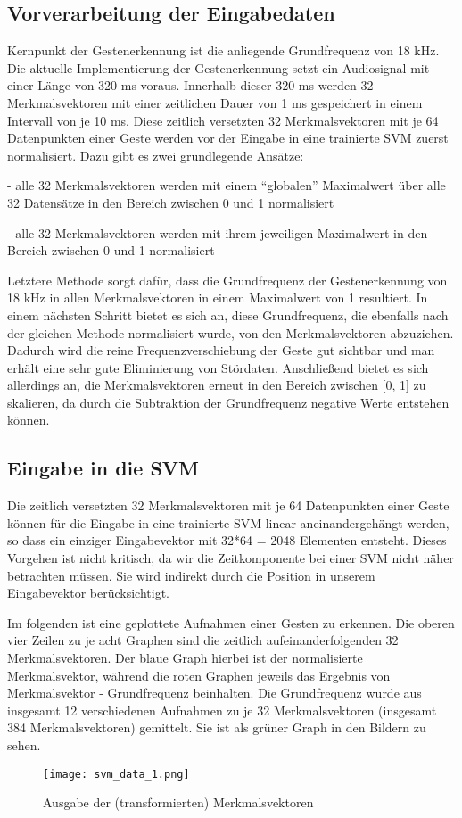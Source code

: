\subsection{Vorverarbeitung der Eingabedaten}

Kernpunkt der Gestenerkennung ist die anliegende Grundfrequenz von 18 kHz. 
Die aktuelle Implementierung der Gestenerkennung setzt ein Audiosignal mit einer Länge von 320 ms voraus. 
Innerhalb dieser 320 ms werden 32 Merkmalsvektoren mit einer zeitlichen Dauer von 1 ms gespeichert in einem Intervall von je 10 ms. 
Diese zeitlich versetzten 32 Merkmalsvektoren mit je 64 Datenpunkten einer Geste werden vor der Eingabe in eine trainierte SVM zuerst normalisiert. 
Dazu gibt es zwei grundlegende Ansätze:

- alle 32 Merkmalsvektoren werden mit einem “globalen” Maximalwert über alle 32 Datensätze in den Bereich zwischen 0 und 1 normalisiert\newline

- alle 32 Merkmalsvektoren werden mit ihrem jeweiligen Maximalwert in den Bereich zwischen 0 und 1 normalisiert

Letztere Methode sorgt dafür, dass die Grundfrequenz der Gestenerkennung von 18 kHz in allen Merkmalsvektoren in einem Maximalwert von 1 resultiert. 
In einem nächsten Schritt bietet es sich an, diese Grundfrequenz, die ebenfalls nach der gleichen Methode normalisiert wurde, von den Merkmalsvektoren abzuziehen. 
Dadurch wird die reine Frequenzverschiebung der Geste gut sichtbar und man erhält eine sehr gute Eliminierung von Stördaten. 
Anschließend bietet es sich allerdings an, die Merkmalsvektoren erneut in den Bereich zwischen [0, 1] zu skalieren, da durch die Subtraktion der Grundfrequenz negative Werte entstehen können.


\subsection{Eingabe in die SVM}

Die zeitlich versetzten 32 Merkmalsvektoren mit je 64 Datenpunkten einer Geste können für die Eingabe in eine trainierte SVM linear aneinandergehängt werden, so dass ein einziger Eingabevektor mit 32*64 = 2048 Elementen entsteht. 
Dieses Vorgehen ist nicht kritisch, da wir die Zeitkomponente bei einer SVM nicht näher betrachten müssen. 
Sie wird indirekt durch die Position in unserem Eingabevektor berücksichtigt.

Im folgenden ist eine geplottete Aufnahmen einer Gesten zu erkennen. 
Die oberen vier Zeilen zu je acht Graphen sind die zeitlich aufeinanderfolgenden 32 Merkmalsvektoren. 
Der blaue Graph hierbei ist der normalisierte Merkmalsvektor, während die roten Graphen jeweils das Ergebnis von Merkmalsvektor - Grundfrequenz beinhalten. 
Die Grundfrequenz wurde aus insgesamt 12 verschiedenen Aufnahmen zu je 32 Merkmalsvektoren (insgesamt 384 Merkmalsvektoren) gemittelt. 
Sie ist als grüner Graph in den Bildern zu sehen.

\begin{figure}[h!]
  \centering
    \texttt{[image: svm\_data\_1.png]}
  \caption{Ausgabe der (transformierten) Merkmalsvektoren}
\end{figure}

